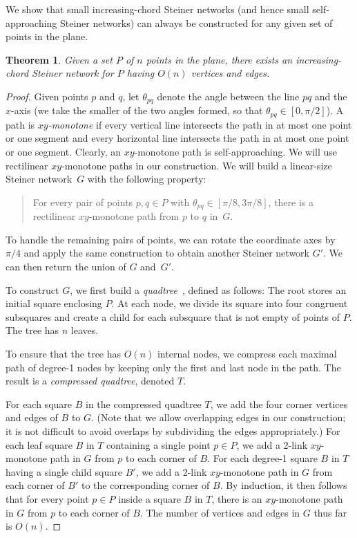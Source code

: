 \documentclass[11pt]{article}
\newtheorem{theorem}{Theorem}
\newcommand{\changeA}[1]{{#1}}
\begin{document}
We show that small increasing-chord Steiner networks (and hence small self-approaching Steiner networks) can always be constructed for any given set of points in the plane.

\begin{theorem}
\label{thm:steiner}
Given a set $P$ of $n$ points in the plane, there exists an increasing-chord Steiner network for $P$ having $O(n)$ vertices and edges.
\end{theorem}
\begin{proof}
Given points $p$ and $q$, let $\theta_{pq}$ denote the angle between the
line $pq$ and the $x$-axis (we take the smaller of the two angles
formed, so that $\theta_{pq}\in [0,\pi/2]$).
A path is {\em $xy$-monotone\/} if every vertical line intersects the path
\changeA{in at most one point or one segment and every horizontal line intersects the path in at most one point or one segment.}
Clearly, an $xy$-monotone path is self-approaching.
\changeA{We will use rectilinear $xy$-monotone paths in our construction.}
We will build a linear-size Steiner network~$G$
with the following property:
\begin{quote}
For every pair of points $p,q\in P$ with
$\theta_{pq}\in [\pi/8,3\pi/8]$, there is
a \changeA{rectilinear} $xy$-monotone path from $p$ to $q$ in~$G$.
\end{quote}
To handle the remaining pairs of points, we can rotate the coordinate axes by $\pi/4$
and apply the same construction to obtain another Steiner network $G'$.
We can then return the union of $G$ and~$G'$.

To construct $G$, we first build a {\em quadtree}~\cite{Har-Peled:book},
defined as follows:
The root stores an initial square enclosing $P$.  At each node,
we divide its square into four congruent subsquares and create
a child for each subsquare that is not empty of points of $P$.
The tree has $n$ leaves.

To ensure that the tree has $O(n)$ internal nodes, we compress each maximal path
of degree-1 nodes by keeping only the first and last node in the path.
The result is a {\em compressed quadtree}, denoted $T$.

For each square $B$ in the compressed quadtree $T$, we add the four corner vertices
and edges of $B$ to $G$.
(Note that we allow overlapping edges in our construction;
it is not difficult to avoid overlaps by subdividing the edges appropriately.)
For each leaf square $B$ in $T$ containing a single point $p\in P$,
we add a 2-link $xy$-monotone path in $G$ from $p$ to each corner of $B$.
For each degree-1 square $B$ in $T$ having a single child square $B'$,
we add a 2-link $xy$-monotone path in $G$
from each corner of $B'$ to the corresponding corner of $B$.
By induction, it then follows
that for every point $p\in P$ inside a square $B$ in $T$,
there is an $xy$-monotone path in $G$ from $p$ to each corner of $B$.
The number of vertices and edges in $G$ thus far is $O(n)$.


\end{proof}
\end{document}
